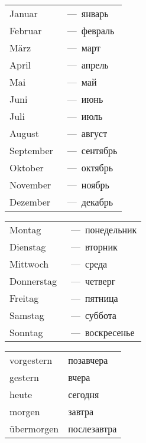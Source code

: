 




\begin{tabular}{ll}
Januar & ~---~январь \\
Februar & ~---~февраль \\
M\" arz & ~---~март \\
April & ~---~апрель \\
Mai & ~---~май \\
Juni & ~---~июнь \\
Juli & ~---~июль \\
August & ~---~август \\
September & ~---~сентябрь \\
Oktober & ~---~октябрь \\
November & ~---~ноябрь \\
Dezember & ~---~декабрь
\end{tabular}




 
\begin{tabular}{ll}
Montag & ~---~понедельник \\
Dienstag & ~---~вторник \\
Mittwoch & ~---~среда \\
Donnerstag & ~---~четверг \\
Freitag & ~---~пятница \\
Samstag & ~---~суббота \\
Sonntag & ~---~воскресенье
\end{tabular}

\begin{tabular}{ll}
vorgestern & позавчера \\
gestern & вчера \\
heute & сегодня \\
morgen & завтра \\
\"ubermorgen & послезавтра \\
\end{tabular}
